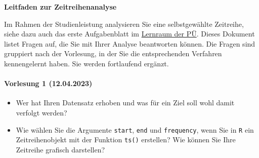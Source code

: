 \begin{center}
    \Large\sffamily
    \textbf{Leitfaden zur Zeitreihenanalyse}
\end{center}

Im Rahmen der Studienleistung analysieren Sie eine selbstgewählte Zeitreihe, siehe dazu auch das erste Aufgabenblatt im \href{https://moodle.uni-bielefeld.de/course/view.php?id=1035}{Lernraum der PÜ}. Dieses Dokument listet Fragen auf, die Sie mit Ihrer Analyse beantworten können. Die Fragen sind gruppiert nach der Vorlesung, in der Sie die entsprechenden Verfahren kennengelernt haben. Sie werden fortlaufend ergänzt.

\paragraph{Vorlesung 1 (12.04.2023)}
\begin{itemize}
    \item Wer hat Ihren Datensatz erhoben und was für ein Ziel soll wohl damit verfolgt werden?
    \item Wie wählen Sie die Argumente \texttt{start}, \texttt{end} und \texttt{frequency}, wenn Sie in \texttt{R} ein Zeitreihenobjekt mit der Funktion \texttt{ts()} erstellen? Wie können Sie Ihre Zeitreihe grafisch darstellen?
\end{itemize}